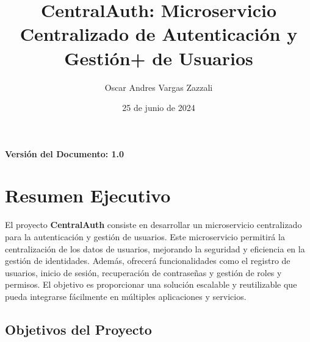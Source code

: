 \documentclass{article}
\title{CentralAuth: Microservicio Centralizado de Autenticación y Gestión+ de Usuarios}
\author{Oscar Andres Vargas Zazzali}
\date{25 de junio de 2024}
\begin{document}
\maketitle

\begin{center}
    \textbf{Versión del Documento: 1.0}
\end{center}
\newpage
\tableofcontents
\newpage

\section{Resumen Ejecutivo}

El proyecto \textbf{CentralAuth} consiste en desarrollar un microservicio centralizado para la autenticación y gestión de usuarios. Este microservicio permitirá la centralización de los datos de usuarios, mejorando la seguridad y eficiencia en la gestión de identidades. Además, ofrecerá funcionalidades como el registro de usuarios, inicio de sesión, recuperación de contraseñas y gestión de roles y permisos. El objetivo es proporcionar una solución escalable y reutilizable que pueda integrarse fácilmente en múltiples aplicaciones y servicios.

\subsection{Objetivos del Proyecto}
\end{document}
